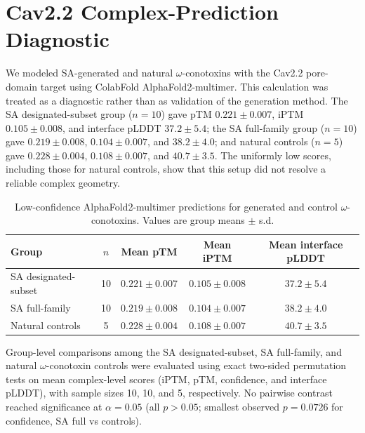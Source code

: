 \section{Cav2.2 Complex-Prediction Diagnostic}
We modeled SA-generated and natural $\omega$-conotoxins with the Cav2.2 pore-domain target
using ColabFold AlphaFold2-multimer. This calculation was treated as a diagnostic rather than
as validation of the generation method. The SA designated-subset group ($n=10$) gave pTM
$0.221\pm0.007$, iPTM $0.105\pm0.008$, and interface pLDDT $37.2\pm5.4$; the SA full-family
group ($n=10$) gave $0.219\pm0.008$, $0.104\pm0.007$, and $38.2\pm4.0$; and natural controls
($n=5$) gave $0.228\pm0.004$, $0.108\pm0.007$, and $40.7\pm3.5$. The uniformly low scores,
including those for natural controls, show that this setup did not resolve a reliable complex
geometry.

\begin{table}[ht]
  \centering
  \footnotesize
  \setlength{\tabcolsep}{3.5pt}
  \caption{Low-confidence AlphaFold2-multimer predictions for generated and control
  $\omega$-conotoxins. Values are group means $\pm$ s.d.}
  \label{tab:docking-validation}
  \begin{tabular}{lcccc}
    \toprule
    Group & $n$ & Mean pTM & Mean iPTM & Mean interface pLDDT \\
    \midrule
    SA designated-subset & 10 & $0.221\pm0.007$ & $0.105\pm0.008$ & $37.2\pm5.4$ \\
    SA full-family & 10 & $0.219\pm0.008$ & $0.104\pm0.007$ & $38.2\pm4.0$ \\
    Natural controls & 5 & $0.228\pm0.004$ & $0.108\pm0.007$ & $40.7\pm3.5$ \\
    \bottomrule
  \end{tabular}
\end{table}

Group-level comparisons among the SA designated-subset, SA full-family, and
natural $\omega$-conotoxin controls were evaluated using exact two-sided
permutation tests on mean complex-level scores (iPTM, pTM, confidence, and
interface pLDDT), with sample sizes 10, 10, and 5, respectively. No pairwise
contrast reached significance at $\alpha=0.05$ (all $p > 0.05$; smallest observed
$p=0.0726$ for confidence, SA full vs controls).

\begin{table}[ht]
  \centering
  \caption{Pairwise exact permutation p-values for $\omega$-conotoxin docking comparisons (all $H_0$: equal means).}
  \label{tab:docking-permutation-pvalues}
\end{table}


